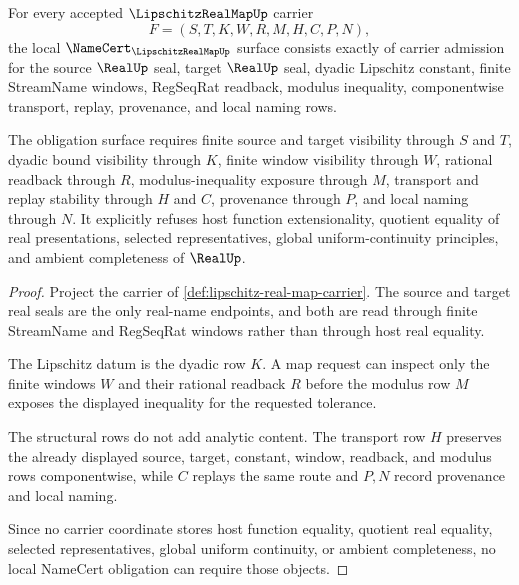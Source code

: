 \begin{theorem}
\label{thm:lipschitz-real-map-namecert-obligations}
For every accepted $\LipschitzRealMapUp$ carrier
$$
F=(S,T,K,W,R,M,H,C,P,N),
$$
the local $\NameCert_{\LipschitzRealMapUp}$ surface consists exactly of carrier admission for the source $\RealUp$ seal, target $\RealUp$ seal, dyadic Lipschitz constant, finite StreamName windows, RegSeqRat readback, modulus inequality, componentwise transport, replay, provenance, and local naming rows.

The obligation surface requires finite source and target visibility through $S$ and $T$, dyadic bound visibility through $K$, finite window visibility through $W$, rational readback through $R$, modulus-inequality exposure through $M$, transport and replay stability through $H$ and $C$, provenance through $P$, and local naming through $N$. It explicitly refuses host function extensionality, quotient equality of real presentations, selected representatives, global uniform-continuity principles, and ambient completeness of $\RealUp$.
\end{theorem}
\begin{proof}
Project the carrier of \autoref{def:lipschitz-real-map-carrier}. The source and target real seals are the only real-name endpoints, and both are read through finite StreamName and RegSeqRat windows rather than through host real equality.

The Lipschitz datum is the dyadic row $K$. A map request can inspect only the finite windows $W$ and their rational readback $R$ before the modulus row $M$ exposes the displayed inequality for the requested tolerance.

The structural rows do not add analytic content. The transport row $H$ preserves the already displayed source, target, constant, window, readback, and modulus rows componentwise, while $C$ replays the same route and $P,N$ record provenance and local naming.

Since no carrier coordinate stores host function equality, quotient real equality, selected representatives, global uniform continuity, or ambient completeness, no local NameCert obligation can require those objects.
\end{proof}

